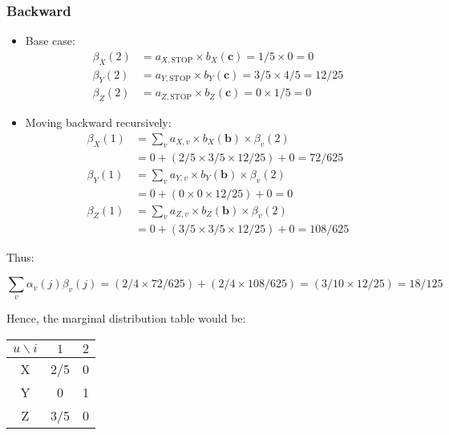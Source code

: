 \documentclass[11pt,fancychapters]{article}
\begin{document}
\subsubsection*{Backward}

\begin{itemize}
	\item Base case:
	\begin{align*}
		\beta_X(2) &= a_{X, \text{STOP}} \times b_X(\textbf{c}) = 1/5 \times 0 = 0 \\
		\beta_Y(2) &= a_{Y, \text{STOP}} \times b_Y(\textbf{c}) = 3/5 \times 4/5 = 12/25 \\
		\beta_Z(2) &= a_{Z, \text{STOP}} \times b_Z(\textbf{c}) = 0 \times 1/5 = 0
	\end{align*}
	
	\item Moving backward recursively:
	\begin{align*}
		\beta_X(1) &= \sum_v a_{X, v} \times b_X(\textbf{b}) \times \beta_v(2) \\
		&= 0 + (2/5 \times 3/5 \times 12/25) + 0 = 72/625 \\
		\beta_Y(1) &= \sum_v a_{Y, v} \times b_Y(\textbf{b}) \times \beta_v(2) \\
		&= 0 + (0 \times 0 \times 12/25) + 0 = 0 \\
		\beta_Z(1) &= \sum_v a_{Z, v} \times b_Z(\textbf{b}) \times \beta_v(2) \\
		&= 0 + (3/5 \times 3/5 \times 12/25) + 0 = 108/625
	\end{align*}
\end{itemize}

Thus:

\begin{equation*}
	\sum_{v} \alpha_v(j) \beta_v(j) = (2/4 \times 72/625) + (2/4 \times 108/625) = (3/10 \times 12/25) = 18/125
\end{equation*}

Hence, the marginal distribution table would be:

\begin{table}[h!]
	\centering
	\begin{tabular}{|c | c | c |} 
		\hline
		$u \backslash i$ & $1$ & $2$ \\
		\hline
		X & 2/5 & 0 \\
		\hline
		Y & 0 & 1 \\
		\hline
		Z & 3/5 & 0 \\ [1ex]
		\hline
	\end{tabular}
\end{table}
\end{document}
